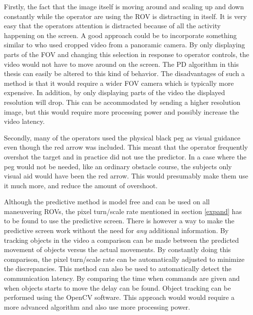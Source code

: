 Firstly, the fact that the image itself is moving around and scaling up and down constantly while the operator are using the ROV is distracting in itself. It is very easy that the operators attention is distracted because of all the activity happening on the screen. A good approach could be to incorporate something similar to \citet{Baldwin1999} who used cropped video from a panoramic camera. By only displaying parts of the FOV and changing this selection in response to operator controls, the video would not have to move around on the screen. The PD algorithm in this thesis can easily be altered to this kind of behavior. The disadvantages of such a method is that it would require a wider FOV camera which is typically more expensive. In addition, by only displaying parts of the video the displayed resolution will drop. This can be accommodated by sending a higher resolution image, but this would require more processing power and possibly increase the video latency.

Secondly, many of the operators used the physical black peg as visual guidance even though the red arrow was included. This meant that the operator frequently overshot the target and in practice did not use the predictor. In a case where the peg would not be needed, like an ordinary obstacle course, the subjects only visual aid would have been the red arrow. This would presumably make them use it much more, and reduce the amount of overshoot.

Although the predictive method is model free and can be used on all maneuvering ROVs, the pixel turn/scale rate mentioned in section \ref{expand} has to be found to use the predictive screen. There is however a way to make the predictive screen work without the need for \textit{any} additional information. By tracking objects in the video a comparison can be made between the predicted movement of objects versus the actual movements. By constantly doing this comparison, the pixel turn/scale rate can be automatically adjusted to minimize the discrepancies. This method can also be used to automatically detect the communication latency. By comparing the time when commands are given and when objects starts to move the delay can be found. Object tracking can be performed using the OpenCV software. This approach would would require a more advanced algorithm and also use more processing power.

